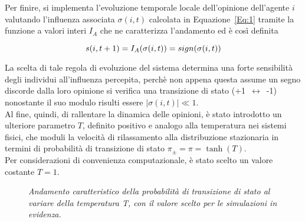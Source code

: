 \documentclass{article}
\begin{document}
Per finire, si implementa l'evoluzione temporale locale dell'opinione dell'agente $\textit{i}$ valutando l'influenza associata $\sigma(i,t)$  calcolata in Equazione~\ref{Eq:1} tramite la funzione a valori interi $I_{A}$ che ne caratterizza l'andamento ed è così definita

\begin{equation}
    s(i,t+1) = I_A(\sigma(i,t)) = sign(\sigma(i,t))
    \medskip
    \label{Eq:3}
\end{equation}

La scelta di tale regola di evoluzione del sistema determina una forte sensibilità degli individui all'influenza percepita, perchè non appena questa assume un segno discorde dalla loro opinione si verifica una transizione di stato \mbox{(+1 $\longleftrightarrow$ -1)} nonostante il suo modulo risulti essere $|\sigma(i,t)| \ll 1$.
\\ Al fine, quindi, di rallentare la dinamica delle opinioni, è stato introdotto un ulteriore parametro $\textit{T}$, definito positivo e analogo alla temperatura nei sistemi fisici, che moduli la velocità di rilassamento alla distribuzione stazionaria in termini di probabilità di transizione di stato $ \pi_{\pm} = \pi = \tanh (T)$.
\\ Per considerazioni di convenienza computazionale, è stato scelto un valore costante $T=1$.

\begin{figure}[h]
\centering
{}
\caption{\textit{Andamento caratteristico della probabilità di transizione di stato al variare della temperatura T, con il valore scelto per le simulazioni in evidenza.}}
\label{fig:4}
\end{figure}
\end{document}

